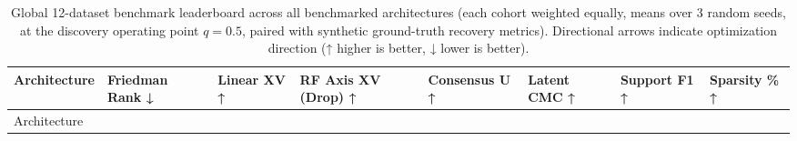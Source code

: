 \documentclass[
  10pt,
  letterpaper,
]{report}
\begin{document}
\begin{longtable}[]{@{}
  >{\raggedright\arraybackslash}p{}
  >{\raggedleft\arraybackslash}p{}
  >{\raggedleft\arraybackslash}p{}
  >{\raggedleft\arraybackslash}p{}
  >{\raggedleft\arraybackslash}p{}
  >{\raggedleft\arraybackslash}p{}
  >{\raggedleft\arraybackslash}p{}
  >{\raggedleft\arraybackslash}p{}@{}}
\caption{Global 12-dataset benchmark leaderboard across all benchmarked
architectures (each cohort weighted equally, means over 3 random seeds,
at the discovery operating point \(q = 0.5\), paired with synthetic
ground-truth recovery metrics). Directional arrows indicate optimization
direction (↑ higher is better, ↓ lower is
better).}\label{tbl-global-leaderboard}\tabularnewline
\toprule\noalign{}
\begin{minipage}[b]{\linewidth}\raggedright
Architecture
\end{minipage} & \begin{minipage}[b]{\linewidth}\raggedleft
Friedman Rank ↓
\end{minipage} & \begin{minipage}[b]{\linewidth}\raggedleft
Linear XV ↑
\end{minipage} & \begin{minipage}[b]{\linewidth}\raggedleft
RF Axis XV (Drop) ↑
\end{minipage} & \begin{minipage}[b]{\linewidth}\raggedleft
Consensus U ↑
\end{minipage} & \begin{minipage}[b]{\linewidth}\raggedleft
Latent CMC ↑
\end{minipage} & \begin{minipage}[b]{\linewidth}\raggedleft
Support F1 ↑
\end{minipage} & \begin{minipage}[b]{\linewidth}\raggedleft
Sparsity \% ↑
\end{minipage} \\
\midrule\noalign{}
\endfirsthead
\toprule\noalign{}
\begin{minipage}[b]{\linewidth}\raggedright
Architecture
\end{minipage} & \begin{minipage}[b]{\linewidth}\raggedleft

\end{minipage}
\end{longtable}
\end{document}
